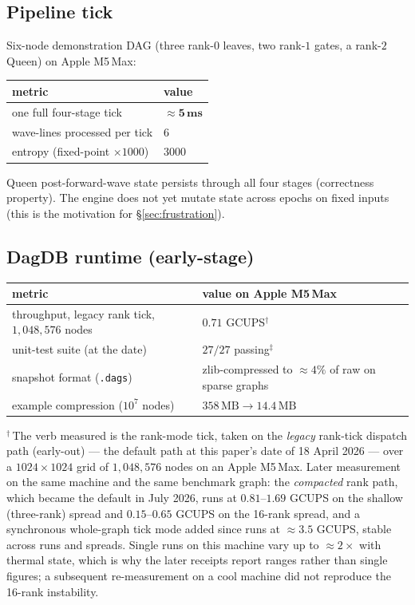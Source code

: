 \documentclass[11pt]{article}
\begin{document}
\subsection*{Pipeline tick}

Six-node demonstration DAG (three rank-$0$ leaves, two rank-$1$
gates, a rank-$2$ Queen) on Apple M5\,Max:

\begin{center}
\begin{tabular}{ll}
\toprule
metric & value \\
\midrule
one full four-stage tick & $\approx\mathbf{5\,\text{ms}}$ \\
wave-lines processed per tick & $6$ \\
entropy (fixed-point $\times 1000$) & $3000$ \\
\bottomrule
\end{tabular}
\end{center}

Queen post-forward-wave state persists through all four stages
(correctness property). The engine does not yet mutate state across
epochs on fixed inputs (this is the motivation for
\S\ref{sec:frustration}).

\subsection*{DagDB runtime (early-stage)}

\begin{center}
\begin{tabular}{ll}
\toprule
metric & value on Apple M5\,Max \\
\midrule
throughput, legacy rank tick, $1{,}048{,}576$ nodes & $\mathbf{0.71}$ GCUPS$^{\dagger}$ \\
unit-test suite (at the date) & $27/27$ passing$^{\ddagger}$ \\
snapshot format (\texttt{.dags}) & zlib-compressed to $\approx 4\%$ of raw on sparse graphs \\
example compression ($10^7$ nodes) & $358\,\text{MB} \to 14.4\,\text{MB}$ \\
\bottomrule
\end{tabular}
\end{center}

\noindent$^{\dagger}$\,The verb measured is the rank-mode tick, taken
on the \emph{legacy} rank-tick dispatch path (early-out) --- the
default path at this paper's date of 18 April 2026 --- over a
$1024\times1024$ grid of $1{,}048{,}576$ nodes on an Apple M5\,Max.
Later measurement on the same machine and the same benchmark graph:
the \emph{compacted} rank path, which became the default in July 2026,
runs at $0.81$--$1.69$ GCUPS on the shallow (three-rank) spread and
$0.15$--$0.65$ GCUPS on the 16-rank spread, and a synchronous
whole-graph tick mode added since runs at $\approx 3.5$ GCUPS, stable
across runs and spreads. Single runs on this machine vary up to
$\approx 2\times$ with thermal state, which is why the later receipts
report ranges rather than single figures; a subsequent re-measurement
on a cool machine did not reproduce the 16-rank instability.
\end{document}
